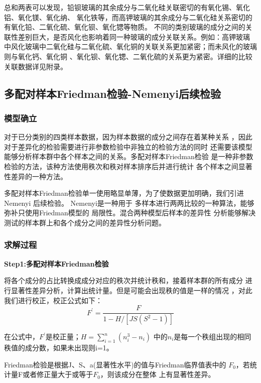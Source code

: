 \documentclass[UTF8]{ctexart}
\begin{document}
总和两表可以发现，铅钡玻璃的其余成分与二氧化硅关联密切的有氧化锡、氧化铝、氧化镁、氧化纳、
氧化铁等，而高钾玻璃的其余成分与二氧化硅关系密切的有氧化铅、二氧化硫、氧化钡、氧化锶等物质。
不同的类别玻璃的成分之间的关联性差别巨大，是否风化也影响着同一种玻璃的成分关联关系。例如：高钾玻璃
中风化玻璃中二氧化硅与二氧化硫、氧化铜的关联关系更加紧密；而未风化的玻璃则与氧化钙、氧化铜
、氧化钡、氧化锶、二氧化硫的关系更为紧密。详细的比较关联数据详见附录。


\subsection{多配对样本Friedman检验-Nemenyi后续检验}
\subsubsection{模型确立}
对于已分类别的四类样本数据，因为样本数据的成分之间存在着某种关系
，因此对于差异化的检验需要进行非参数检验中非独立的检验方法的同时
还需要该模型能够分析样本群中各个样本之间的关系。多配对样本Friedman检验
是一种非参数检验的方法，该种方法使用秩次和秩对样本排序后并进行统计
各个样本之间显著性差异的一种方法。

多配对样本Friedman检验单一使用略显单薄，为了使数据更加明确，我们引进Nemenyi 后续检验。
Nemenyi是一种用于
多样本进行两两比较的一种算法，能够弥补只使用Friedman模型的
局限性。混合两种模型后样本的差异性
分析能够解决测试的样本群上和各个成分之间的差异性分析问题。

\subsubsection{求解过程}
\textbf{Step1:多配对样本Friedman检验}

将各个成分的占比转换成成分对应的秩次并统计秩和，接着样本群的所有成分
进行显著性差异分析，计算出统计量。但是可能会出现秩的值是一样的情况
，对此我们进行校正，校正公式如下：
\begin{equation}
    F^{\prime}=\frac{F}{1-H /\left[JS\left(S^{2}-1\right)\right]}
\end{equation}

在公式中，$F^{\prime}$是校正量；$H=\sum_{i=1}^{n}(n_{i}^{3}-n_{i})$
中的$n_{i}$是每一个秩组出现的相同秩值的成分数，如果未出现则i=1。

Friedman检验是根据J、S、a(显著性水平)的值与Friedman临界值表中的
$F_{0}$，若统计量F或者修正量大于或等于$F_{0}$，则该成分在整体
上有显著性差异。
\end{document}
